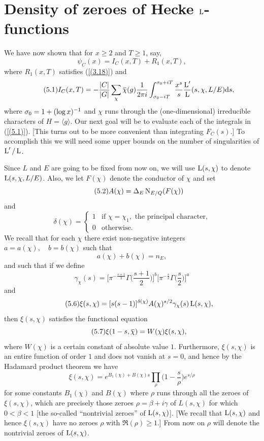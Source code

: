 \documentclass[./main]{subfiles}
\begin{document}
\section{Density of zeroes of Hecke \texorpdfstring{$\operatorname{L}$}{L}-functions}\setlength{\headheight}{22.54279pt}
We have now shown that for $x\geq 2$ and $T\geq1$, say,
\[\psi_C(x) = I_C{(x,T)} + R_1(x,T), \]
where $R_1(x,T)$ satisfies (\ref{(3.18)}) and
\[\tag{5.1}\label{(5.1)}I_C(x,T) = -\frac{\small|C\small|}{\small|G\small|}\sum_{\chi}{\xoverline{\chi}(g)\frac{1}{2\pi i}}\int_{\sigma_0-iT}^{\sigma_0+iT}{\frac{x^s}{s}\frac{\L'}{\L}(s,\chi,L/E)\dd{s}}, \]
where $\sigma_0=1+\small(\log{x}\small)^{-1}$ and $\chi$ runs through the (one-dimensional) irreducible characters of $H=\langle g\rangle$. Our next goal will be to evaluate each of the integrals in (\ref{(5.1)}). [This turns out to be more convenient than integrating $F_C(s)$.] To accomplish this we will need some upper bounds on the number of singularities of $\operatorname{L}'/\operatorname{L}$.

Since $L$ and $E$ are going to be fixed from now on, we will use $\operatorname{L}(s,\chi)$ to denote $\operatorname{L}(s,\chi,L/E)$. Also, we let $F(\chi)$ denote the conductor of $\chi$ and set
\[\tag{5.2}\label{(5.2)}A(\chi) = \Delta_E\operatorname{N}_{E/Q}(F(\chi)) \]
and
\[\tag{5.3}\label{(5.3)}\delta(\chi) =
\begin{cases}
1 & \text{if } \chi = \chi_1,\text{ the principal character,} \\
0 & \text{otherwise.}
\end{cases}\]
We recall that for each $\chi$ there exist non-negative integers $a = a(\chi),\quad b=b(\chi)$ such that
\[\tag{5.4}\label{(5.4)}a(\chi)+b(\chi) = n_E,\]
and such that if we define
\[\tag{5.5}\label{(5.5)}\gamma_\chi(s) = \bigg[\pi^{-\frac{s+1}{2}}\Gamma\Big(\frac{s+1}{2}\Big)\bigg]^b\bigg[\pi^{-\frac{s}{2}}\Gamma\Big(\frac{s}{2}\Big)\bigg]^a\]
and
\[\label{(5.6)}\tag{5.6} \xi(s,\chi)= [s(s-1)]^{\delta(\chi)}A(\chi)^{s/2}\gamma_{\chi}(s)\operatorname{L}(s,\chi),\]
then $\xi(s,\chi)$ satisfies the functional equation
\[\label{(5.7)}\tag{5.7}\xi(1-s,\xoverline{\chi}) = W(\chi)\xi(s,\chi),\]
where $W(\chi)$ is a certain constant of absolute value $1$. Furthermore, $\xi(s,\chi)$ is an entire function of order $1$ and does not vanish at $s=0$, and hence by the Hadamard product theorem we have
\[\tag{5.8}\label{(5.8)}\xi(s,\chi) = e^{B_1(\chi)+B(\chi)s} \prod_{\rho}{\Big(1-\frac{s}{\rho}\Big)e^{s/\rho}}\]
for some constants $B_1(\chi)$ and $B(\chi)$ where $\rho$ runs through all the zeroes of $\xi(s,\chi)$, which are precisely those zeroes $\rho = \beta + i\gamma$ of $L(s,\chi)$ for which $0<\beta<1$ [the so-called ``nontrivial zeroes'' of $\operatorname{L}(s,\chi)$]. [We recall that $\operatorname{L}(s,\chi)$ and hence $\xi(s,\chi)$ have no zeroes $\rho$ with $\Re{(\rho)}\geq1$.] From now on $\rho$ will denote the nontrivial zeroes of $\operatorname{L}(s,\chi)$.
\end{document}
